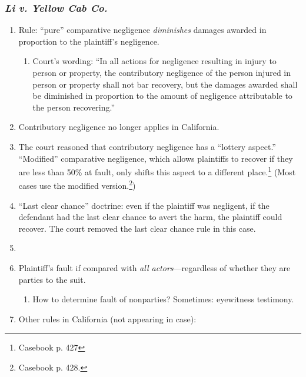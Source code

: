 \subsubsection{\emph{Li v. Yellow Cab Co.}}

\begin{enumerate}
    \item Rule: ``pure'' comparative negligence \emph{diminishes} damages awarded in proportion to the plaintiff's negligence.
    \begin{enumerate}
        \item Court's wording: ``In all actions for negligence resulting in injury to person or property, the contributory negligence of the person injured in person or property shall not bar recovery, but the damages awarded shall be diminished in proportion to the amount of negligence attributable to the person recovering.'' %
    \end{enumerate}
    \item Contributory negligence no longer applies in California.
    \item The court reasoned that contributory negligence has a ``lottery aspect.'' ``Modified'' comparative negligence, which allows plaintiffs to recover if they are less than 50\% at fault, only shifts this aspect to a different place.\footnote{Casebook p. 427} (Most cases use the modified version.\footnote{Casebook p. 428.})
    \item ``Last clear chance'' doctrine: even if the plaintiff was negligent, if the defendant had the last clear chance to avert the harm, the plaintiff could recover. The court removed the last clear chance rule in this case. %
    \item %
    \item Plaintiff's fault if compared with \emph{all actors}---regardless of whether they are parties to the suit.
    \begin{enumerate}
        \item How to determine fault of nonparties? Sometimes: eyewitness testimony. 
    \end{enumerate}
    \item Other rules in California (not appearing in case):
    \begin{enumerate}

\end{enumerate}
\end{enumerate}
